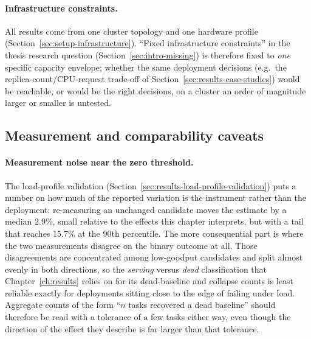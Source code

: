 \paragraph{Infrastructure constraints.} All results come from one cluster
topology and one hardware profile (Section~\ref{sec:setup-infrastructure}).
``Fixed infrastructure constraints'' in the thesis research question
(Section~\ref{sec:intro-missing}) is therefore fixed to \emph{one} specific
capacity envelope; whether the same deployment decisions (e.g.\ the
replica-count/CPU-request trade-off of Section~\ref{sec:results-case-studies})
would be reachable, or would be the right decisions, on a cluster an order
of magnitude larger or smaller is untested.

\subsection{Measurement and comparability caveats}
\label{sec:discussion-measurement-caveats}

\paragraph{Measurement noise near the zero threshold.} The load-profile
validation (Section~\ref{sec:results-load-profile-validation}) puts a number
on how much of the reported variation is the instrument rather than the
deployment: re-measuring an unchanged candidate moves the estimate by a
median $2.9\%$, small relative to the effects this chapter interprets, but
with a tail that reaches $15.7\%$ at the 90th percentile. The more
consequential part is where the two measurements disagree on the binary
outcome at all. Those disagreements are concentrated among low-goodput
candidates and split almost evenly in both directions, so the
\emph{serving} versus \emph{dead} classification that Chapter~\ref{ch:results}
relies on for its dead-baseline and collapse counts is least reliable exactly
for deployments sitting close to the edge of failing under load. Aggregate
counts of the form ``$n$ tasks recovered a dead baseline'' should therefore
be read with a tolerance of a few tasks either way, even though the direction
of the effect they describe is far larger than that tolerance.

